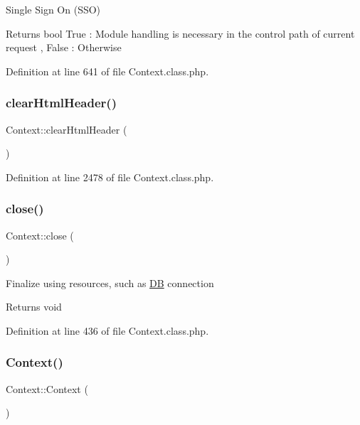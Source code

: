 Single Sign On (S\+SO)

\begin{DoxyReturn}{Returns}
bool True \+: Module handling is necessary in the control path of current request , False \+: Otherwise 
\end{DoxyReturn}


Definition at line 641 of file Context.\+class.\+php.

\mbox{\label{classContext_a5f0332b30b4ad65c0374ebd848c1dd98}} 
\subsubsection{\texorpdfstring{clear\+Html\+Header()}{clearHtmlHeader()}}
{\footnotesize\ttfamily Context\+::clear\+Html\+Header (\begin{DoxyParamCaption}{ }\end{DoxyParamCaption})}



Definition at line 2478 of file Context.\+class.\+php.

\mbox{\label{classContext_ad59031e45d21ad27eb7d06e0ee76f008}} 
\subsubsection{\texorpdfstring{close()}{close()}}
{\footnotesize\ttfamily Context\+::close (\begin{DoxyParamCaption}{ }\end{DoxyParamCaption})}

Finalize using resources, such as \hyperlink{classDB}{DB} connection

\begin{DoxyReturn}{Returns}
void 
\end{DoxyReturn}


Definition at line 436 of file Context.\+class.\+php.

\mbox{\label{classContext_a652cdcd2eedc8dbd9110bd284c5d5cf0}} 
\subsubsection{\texorpdfstring{Context()}{Context()}}
{\footnotesize\ttfamily Context\+::\+Context (\begin{DoxyParamCaption}{ }\end{DoxyParamCaption})}

